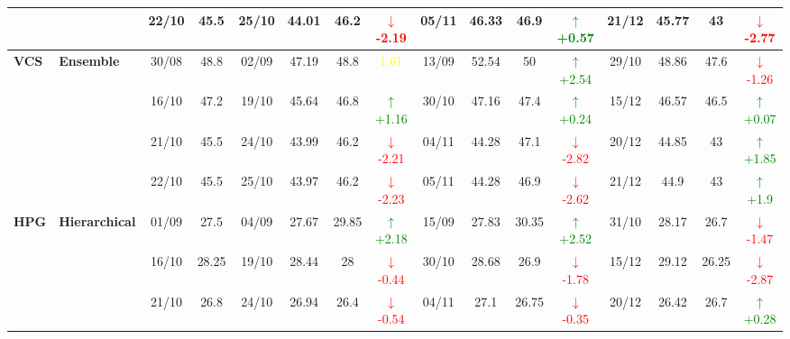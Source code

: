 \documentclass{ieeeaccess}
\begin{document}
{\begin{longtable}{llcc|cccc|cccc|cccc}
&
& 22/10 & 45.5 & 25/10 & 44.01 & 46.2 & \textcolor{red}{\(\downarrow\)-2.19} & 05/11 & 46.33 & 46.9 & \textcolor{green}{\(\uparrow\)+0.57} & 21/12 & 45.77 & 43 & \textcolor{red}{\(\downarrow\)-2.77} \\
\midrule



\multirow{4}{*}{\textbf{VCS}} 
& \textbf{Ensemble}
& 30/08 & 48.8 & 02/09 & 47.19 & 48.8 & \textcolor{yellow}{1.61} & 13/09 & 52.54 & 50 & \textcolor{green}{\(\uparrow\)+2.54} & 29/10 & 48.86 & 47.6 & \textcolor{red}{\(\downarrow\)-1.26} \\

&
& 16/10 & 47.2 & 19/10 & 45.64 & 46.8 & \textcolor{green}{\(\uparrow\)+1.16} & 30/10 & 47.16 & 47.4 & \textcolor{green}{\(\uparrow\)+0.24} & 15/12 & 46.57 & 46.5 & \textcolor{green}{\(\uparrow\)+0.07} \\

&
& 21/10 & 45.5 & 24/10 & 43.99 & 46.2 & \textcolor{red}{\(\downarrow\)-2.21} & 04/11 & 44.28 & 47.1 & \textcolor{red}{\(\downarrow\)-2.82} & 20/12 & 44.85 & 43 & \textcolor{green}{\(\uparrow\)+1.85} \\

&
& 22/10 & 45.5 & 25/10 & 43.97 & 46.2 & \textcolor{red}{\(\downarrow\)-2.23} & 05/11 & 44.28 & 46.9 & \textcolor{red}{\(\downarrow\)-2.62} & 21/12 & 44.9 & 43 & \textcolor{green}{\(\uparrow\)+1.9}  \\
\midrule


\multirow{4}{*}{\textbf{HPG}} 
& \textbf{Hierarchical}
& 01/09 & 27.5 & 04/09 & 27.67 & 29.85 & \textcolor{green}{\(\uparrow\)+2.18} & 15/09 & 27.83 & 30.35 & \textcolor{green}{\(\uparrow\)+2.52} & 31/10 & 28.17 & 26.7 & \textcolor{red}{\(\downarrow\)-1.47} \\

& 
& 16/10 & 28.25 & 19/10 & 28.44 & 28 & \textcolor{red}{\(\downarrow\)-0.44} & 30/10 & 28.68 & 26.9 & \textcolor{red}{\(\downarrow\)-1.78} & 15/12 & 29.12 & 26.25 & \textcolor{red}{\(\downarrow\)-2.87} \\

& 
& 21/10 & 26.8 & 24/10 & 26.94 & 26.4 & \textcolor{red}{\(\downarrow\)-0.54} & 04/11 & 27.1 & 26.75 & \textcolor{red}{\(\downarrow\)-0.35} & 20/12 & 26.42 & 26.7 & \textcolor{green}{\(\uparrow\)+0.28} \\


\end{longtable}}
\end{document}
